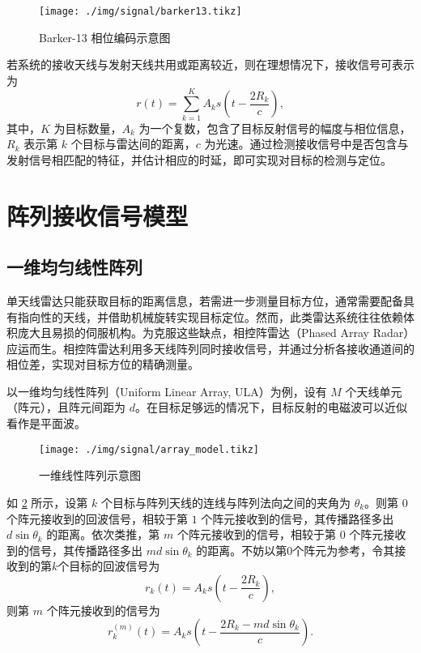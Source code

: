 \begin{figure}[htb!]
    \centering
    \texttt{[image: ./img/signal/barker13.tikz]}
    \caption{Barker-13 相位编码示意图}
    \label{fig_barker}
\end{figure}

若系统的接收天线与发射天线共用或距离较近，则在理想情况下，接收信号可表示为
\[
    r(t) = \sum_{k=1}^{K} A_k s\left(t - \frac{2 R_k}{c}\right),
\]
其中，$K$ 为目标数量，$A_k$ 为一个复数，包含了目标反射信号的幅度与相位信息，$R_k$ 表示第 $k$ 个目标与雷达间的距离，$c$ 为光速。通过检测接收信号中是否包含与发射信号相匹配的特征，并估计相应的时延，即可实现对目标的检测与定位。

\section{阵列接收信号模型}

\subsection{一维均匀线性阵列}
单天线雷达只能获取目标的距离信息，若需进一步测量目标方位，通常需要配备具有指向性的天线，并借助机械旋转实现目标定位。然而，此类雷达系统往往依赖体积庞大且易损的伺服机构。为克服这些缺点，相控阵雷达（Phased Array Radar）应运而生。相控阵雷达利用多天线阵列同时接收信号，并通过分析各接收通道间的相位差，实现对目标方位的精确测量。

以一维均匀线性阵列（Uniform Linear Array, ULA）为例，设有 $M$ 个天线单元（阵元），且阵元间距为 $d$。在目标足够远的情况下，目标反射的电磁波可以近似看作是平面波。

\begin{figure}[htb!]
    \centering
    \texttt{[image: ./img/signal/array\_model.tikz]}
    \caption{一维线性阵列示意图}
    \label{fig_array}
\end{figure}

如 \cref{fig_array} 所示，设第 $k$ 个目标与阵列天线的连线与阵列法向之间的夹角为 $\theta_k$。则第 $0$ 个阵元接收到的回波信号，相较于第 $1$ 个阵元接收到的信号，其传播路径多出 $d \sin\theta_k$ 的距离。依次类推，第 $m$ 个阵元接收到的信号，相较于第 $0$ 个阵元接收到的信号，其传播路径多出 $m d \sin\theta_k$ 的距离。不妨以第0个阵元为参考，令其接收到的第\( k \)个目标的回波信号为
\[
    r_k(t) = A_k s\left(t - \frac{2 R_k}{c}\right),
\]
则第 $m$ 个阵元接收到的信号为
\[
    r_k^{(m)}(t) = A_k s\left(t - \frac{2 R_k - m d \sin\theta_k}{c}\right).
\]


